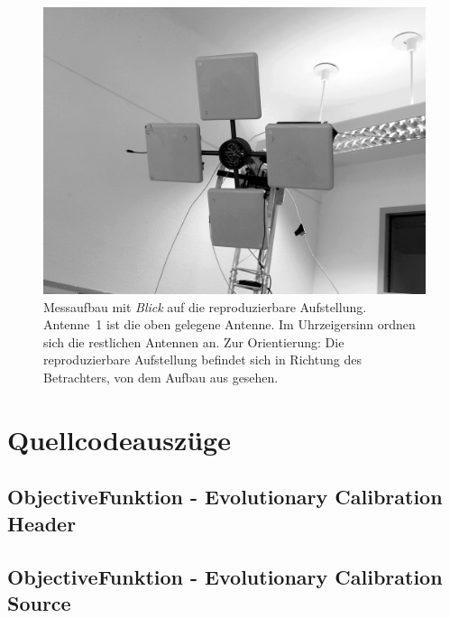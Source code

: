 \begin{appendix}
\begin{figure}[h!]
         \includegraphics[width=\textwidth]{img/4AntennaSetup.png}
         \caption[Übersicht Kalibrieraufbau]{Messaufbau mit \textit{Blick} auf die reproduzierbare Aufstellung. Antenne~1 ist die oben gelegene Antenne. Im Uhrzeigersinn ordnen sich die restlichen Antennen an. Zur Orientierung: Die reproduzierbare Aufstellung befindet sich in Richtung des Betrachters, von dem Aufbau aus gesehen.}
         \label{fig:Spider_setup1}
\end{figure}
\newpage
%
\chapter{Quellcodeauszüge}
\section{ObjectiveFunktion - Evolutionary Calibration Header}

\lstset{
	basicstyle=\scriptsize,
	language=C++,
	numbers=left,
	breaklines=true,
	frame=tbrl,
	breakatwhitespace=false
	breaklines=true,  
	xleftmargin=1cm,
	tabsize=2,
	showstringspaces=false}


\label{app:EvolutionaryCalibration1}
\newpage

\section{ObjectiveFunktion - Evolutionary Calibration Source}

\label{app:EvolutionaryCalibration2}
\newpage
%

\end{appendix}
